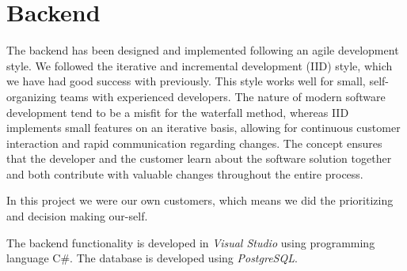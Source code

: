 \chapter{Backend}
\label{chap:backend}

The backend has been designed and implemented following an agile development style. We followed the iterative and incremental development (IID) style, which we have had good success with previously. This style works well for small, self-organizing teams with experienced developers. The nature of modern software development tend to be a misfit for the waterfall method, whereas IID implements small features on an iterative basis, allowing for continuous customer interaction and rapid communication regarding changes. The concept ensures that the developer and the customer learn about the software solution together and both contribute with valuable changes throughout the entire process. 

In this project we were our own customers, which means we did the prioritizing and decision making our-self.

The backend functionality is developed in \textit{Visual Studio}\cite{visualstudio} using programming language C\#. The database is developed using \textit{PostgreSQL}\cite{postgreSQL}.





